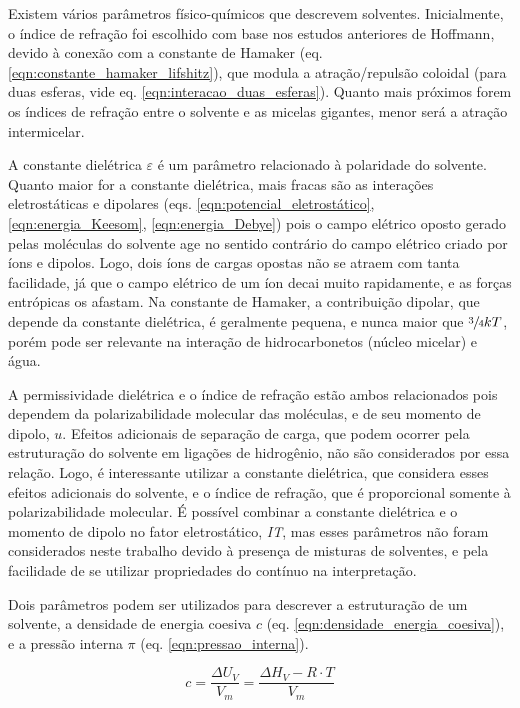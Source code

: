 		Existem vários parâmetros físico-químicos que descrevem solventes. Inicialmente, o índice de refração foi escolhido com base nos estudos anteriores de Hoffmann, devido à conexão com a constante de Hamaker (eq. \ref{eqn:constante_hamaker_lifshitz}), que modula a atração/repulsão coloidal (para duas esferas, vide eq. \ref{eqn:interacao_duas_esferas}). Quanto mais próximos forem os índices de refração entre o solvente e as micelas gigantes, menor será a atração intermicelar.
		
		A constante dielétrica \(\varepsilon\) é um parâmetro relacionado à polaridade do solvente. Quanto maior for a constante dielétrica, mais fracas são as interações eletrostáticas e dipolares (eqs. \ref{eqn:potencial_eletrostático}, \ref{eqn:energia_Keesom}, \ref{eqn:energia_Debye}) pois o campo elétrico oposto gerado pelas moléculas do solvente age no sentido contrário do campo elétrico criado por íons e dipolos. Logo, dois íons de cargas opostas não se atraem com tanta facilidade, já que o campo elétrico de um íon decai muito rapidamente, e as forças entrópicas os afastam. Na constante de Hamaker, a contribuição dipolar, que depende da constante dielétrica, é geralmente pequena, e nunca maior que \(\sfrac{3}{4}kT\), porém pode ser relevante na interação de hidrocarbonetos (núcleo micelar) e água.
		
		A permissividade dielétrica e o índice de refração estão ambos relacionados pois dependem da polarizabilidade molecular das moléculas, e de seu momento de dipolo, \(u\). Efeitos adicionais de separação de carga, que podem ocorrer pela estruturação do solvente em ligações de hidrogênio, não são considerados por essa relação. Logo, é interessante utilizar a constante dielétrica, que considera esses efeitos adicionais do solvente, e o índice de refração, que é proporcional somente à polarizabilidade molecular. É possível combinar a constante dielétrica e o momento de dipolo no fator eletrostático, \emph{IT}, mas esses parâmetros não foram considerados neste trabalho devido à presença de misturas de solventes, e pela facilidade de se utilizar propriedades do contínuo na interpretação. %
		
		Dois parâmetros podem ser utilizados para descrever a estruturação de um solvente, a densidade de energia coesiva \(c\) (eq. \ref{eqn:densidade_energia_coesiva}), e a pressão interna \(\pi\) (eq. \ref{eqn:pressao_interna}).  %
		
		\begin{equation}
			c = \dfrac{\Delta U_V}{V_m} = \dfrac{\Delta H_V - R\cdot T}{V_m}
			\label{eqn:densidade_energia_coesiva}
		\end{equation}
		
